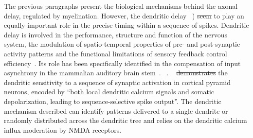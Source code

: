 \documentclass[brainsci, %
               review,accept,pdftex,moreauthors %
               ]{Definitions/mdpi}
\providecommand{\DIFadd}[1]{{\protect\color{blue}\uwave{#1}}} %
\providecommand{\DIFdel}[1]{{\protect\color{red}\sout{#1}}}                      %
\providecommand{\DIFaddbegin}{} %
\providecommand{\DIFaddend}{} %
\providecommand{\DIFdelbegin}{} %
\providecommand{\DIFdelend}{} %
\newcommand{\DIFscaledelfig}{0.5}
\newlength{\DIFdelgraphicswidth} %
\newlength{\DIFdelgraphicsheight} %
\newcommand{\DIFaddincludegraphics}[2][]{{\color{blue}\fbox{\DIFOincludegraphics[#1]{#2}}}} %
\newcommand{\DIFdelincludegraphics}[2][]{%
\sbox{\DIFdelgraphicsbox}{\DIFOincludegraphics[#1]{#2}}%
\settoboxwidth{\DIFdelgraphicswidth}{\DIFdelgraphicsbox} %
\settoboxtotalheight{\DIFdelgraphicsheight}{\DIFdelgraphicsbox} %
\scalebox{\DIFscaledelfig}{%
\parbox[b]{\DIFdelgraphicswidth}{\usebox{\DIFdelgraphicsbox}\\[-\baselineskip] \rule{\DIFdelgraphicswidth}{0em}}\llap{\resizebox{\DIFdelgraphicswidth}{\DIFdelgraphicsheight}{%
\setlength{\unitlength}{\DIFdelgraphicswidth}%
\begin{picture}(1,1)%
\thicklines\linethickness{2pt} %
{\color[rgb]{1,0,0}\put(0,0){\framebox(1,1){}}}%
{\color[rgb]{1,0,0}\put(0,0){\line( 1,1){1}}}%
{\color[rgb]{1,0,0}\put(0,1){\line(1,-1){1}}}%
\end{picture}%
}\hspace*{3pt}}} %
} %
\DeclareRobustCommand{\DIFaddbegin}{\DIFOaddbegin \let\includegraphics\DIFaddincludegraphics} %
\DeclareRobustCommand{\DIFaddend}{\DIFOaddend \let\includegraphics\DIFOincludegraphics} %
\DeclareRobustCommand{\DIFdelbegin}{\DIFOdelbegin \let\includegraphics\DIFdelincludegraphics} %
\DeclareRobustCommand{\DIFdelend}{\DIFOaddend \let\includegraphics\DIFOincludegraphics} %
\begin{document}
The previous paragraphs present the biological mechanisms behind the axonal delay, regulated by myelination. However, the dendritic delay \DIFdelbegin %
\DIFdelend \DIFaddbegin {}\DIFaddend ~\citep{seidl_mechanisms_2010}) \DIFdelbegin \DIFdel{seem }\DIFdelend \DIFaddbegin \DIFadd{seems }\DIFaddend to play an equally important role in the precise timing within a sequence of spikes. Dendritic delay is involved in the performance, structure and function of the nervous system, the modulation of spatio-temporal properties of pre- and post-synaptic activity patterns and the functional limitations of sensory feedback control efficiency~\citep{madadi_asl_dendritic_2018}. Its role has been specifically identified in the compensation of input asynchrony in the mammalian auditory brain stem~\citep{spencer_compensation_2018}. \citet{mel_synaptic_2017} \DIFdelbegin %
\DIFdelend \DIFaddbegin {}\DIFaddend ~\citep{golding_dendritic_2002}. ~\citet{branco_dendritic_2010} \DIFdelbegin \DIFdel{demonstrates }\DIFdelend \DIFaddbegin \DIFadd{demonstrated }\DIFaddend the dendritic sensitivity to a sequence of synaptic activation in cortical pyramid neurons, encoded by ``both local dendritic calcium signals and somatic depolarization, leading to sequence-selective spike output''. The dendritic mechanism described can identify patterns delivered to a single dendrite or randomly distributed across the dendritic tree and relies on the dendritic calcium influx moderation by NMDA receptors.
\end{document}
